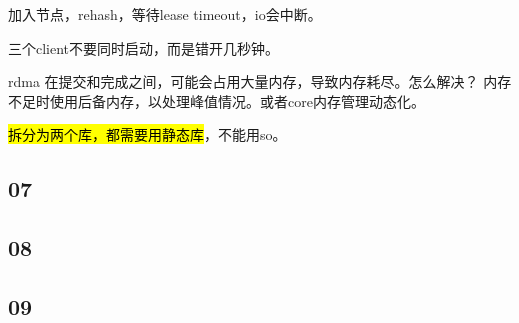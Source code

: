 加入节点，rehash，等待lease timeout，io会中断。

三个client不要同时启动，而是错开几秒钟。

rdma 在提交和完成之间，可能会占用大量内存，导致内存耗尽。怎么解决？
内存不足时使用后备内存，以处理峰值情况。或者core内存管理动态化。

\hl{拆分为两个库，都需要用静态库}，不能用so。

\subsection{07}

\subsection{08}

\subsection{09}

